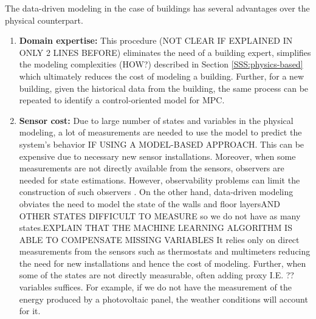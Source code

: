 \textcolor[rgb]{0,0,1}{The data-driven modeling in the case of buildings has several advantages over the physical counterpart.}
\begin{enumerate}
	
	\item \textcolor[rgb]{0,0,1}{\textbf{Domain expertise:} 
	This procedure (\textcolor[rgb]{1,0,0}{NOT CLEAR IF EXPLAINED IN ONLY 2 LINES BEFORE}) eliminates the need of a building expert, simplifies the modeling complexities (\textcolor[rgb]{1,0,0}{HOW?}) described in Section \ref{SSS:physics-based} which ultimately reduces the cost of modeling a building. Further, for a new building, given the historical data from the building, the same process can be repeated to identify a control-oriented model for MPC.}
	
	\item \textcolor[rgb]{0,0,1}{\textbf{Sensor cost:}
	Due to large number of states and variables in the physical modeling, a lot of measurements are needed to use the model to predict the system's behavior \textcolor[rgb]{1,0,0}{IF USING A MODEL-BASED APPROACH}.
	This can be expensive due to necessary new sensor installations.
	Moreover, when some measurements are not directly available from the sensors, observers are needed for state estimations.
	However, observability problems can limit the construction of such observers \cite{Dorf2011MCS}. 
	On the other hand, data-driven modeling obviates the need to model the state of the walls and floor layers\textcolor[rgb]{1,0,0}{AND OTHER STATES DIFFICULT TO MEASURE} so we do not have as many states.\textcolor[rgb]{1,0,0}{EXPLAIN THAT THE MACHINE LEARNING ALGORITHM IS ABLE TO COMPENSATE MISSING VARIABLES}
	It relies only on direct measurements from the sensors such as thermostats and multimeters reducing the need for new installations and hence the cost of modeling.
	Further, when some of the states are not directly measurable, often adding proxy \textcolor[rgb]{1,0,0}{I.E. ??}variables suffices. 
	For example, if we do not have the measurement of the energy produced by a photovoltaic panel, the weather conditions will account for it.}
	

\end{enumerate}
